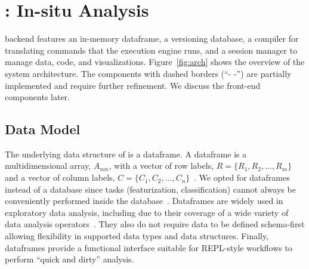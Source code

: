 \section{\system: In-situ Analysis}\label{sec:system}
\system backend features an in-memory dataframe, a versioning database, a compiler for translating \vta commands that the execution engine runs, and a session manager to manage data, code, and visualizations. Figure~\ref{fig:arch} shows the overview of the \system system architecture. The components with dashed borders (``- -'') are partially implemented and require further refinement. We discuss the front-end components later.

\subsection{Data Model}
The underlying data structure of \system is a dataframe. A dataframe is a multidimensional array, $A_{mn}$, with a vector of row labels, $R = \{R_1, R_2, \ldots, R_m\}$ and a vector of column labels, $C = \{C_1,C_2,\ldots,C_n\}$~\cite{modin}. 
We opted for dataframes instead of a database since 
\vita tasks
(\eg featurization, classification) cannot always be conveniently performed inside the database~\cite{lajus2014efficient}.
Dataframes are widely used in
exploratory data analysis, including \vita due to their coverage of a wide variety of data analysis operators~\cite{modin}. 
They also do not require data to be defined schema-first allowing flexibility in supported data types and data structures. Finally, dataframes provide a functional interface suitable for REPL-style \vita workflows to perform ``quick and dirty'' analysis.

